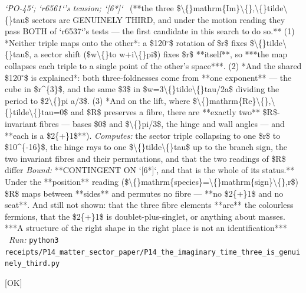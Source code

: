 \begin{description}
\textit{`PO-45`; `r6561`'s tension; `[6*]`} \ (**the three \$\textbackslash\{\}mathrm\{Im\}\textbackslash\{\},\textbackslash\{\}tilde\textbackslash\{\}tau\$ sectors are GENUINELY THIRD, and under the motion reading they pass BOTH of `r6537`'s tests --- the first candidate in this search to do so.** (1) *Neither triple maps onto the other*: a \$120\ensuremath{^\circ}\$ rotation of \$r\$ fixes \$\textbackslash\{\}tilde\textbackslash\{\}tau\$, a sector shift (\$w\textbackslash\{\}to w+i\textbackslash\{\}pi\$) fixes \$r\$ **itself**, so ***the map collapses each triple to a single point of the other's space***. (2) *And the shared \$120\ensuremath{^\circ}\$ is explained*: both three-foldnesses come from **one exponent** --- the cube in \$r\textasciicircum{}\{3\}\$, and the same \$3\$ in \$w=3\textbackslash\{\}tilde\textbackslash\{\}tau/2a\$ dividing the period to \$2\textbackslash\{\}pi a/3\$. (3) *And on the lift, where \$\textbackslash\{\}mathrm\{Re\}\textbackslash\{\},\textbackslash\{\}tilde\textbackslash\{\}tau=0\$ and \$R\$ preserves a fibre, there are **exactly two** \$R\$-invariant fibres --- bases \$0\$ and \$\textbackslash\{\}pi/3\$, the hinge and wall angles --- and **each is a \$2\{+\}1\$**). 
\emph{Computes:} the sector triple collapsing to one \$r\$ to \$10\textasciicircum{}\{-16\}\$, the hinge rays to one \$\textbackslash\{\}tilde\textbackslash\{\}tau\$ up to the branch sign, the two invariant fibres and their permutations, and that the two readings of \$R\$ differ
 \emph{Bound:}  **CONTINGENT ON `[6*]`, and that is the whole of its status.** Under the **position** reading (\$\textbackslash\{\}mathrm\{species\}=\textbackslash\{\}mathrm\{sign\}\textbackslash\{\},r\$) \$R\$ maps between **sides** and permutes no fibre --- **no \$2\{+\}1\$ and no seat**.  And still not shown: that the three fibre elements **are** the colourless fermions, that the \$2\{+\}1\$ is doublet-plus-singlet, or anything about masses. ***A structure of the right shape in the right place is not an identification***
\ \emph{Run:} \texttt{python3 receipts/P14\_matter\_sector\_paper/P14\_the\_imaginary\_time\_three\_is\_genuinely\_third.py}
\item[\rcptlabel{P14_the_binding_radius_is_a_branch_point_of_the_time_map}{P14R70}\textbf{P14R70}\quad\texttt{P14\_the\_binding\_radius\_is\_a\_branch\_point\_of\_the\_time\_map}]\hfill\textsf{[OK]}\\

\end{description}
